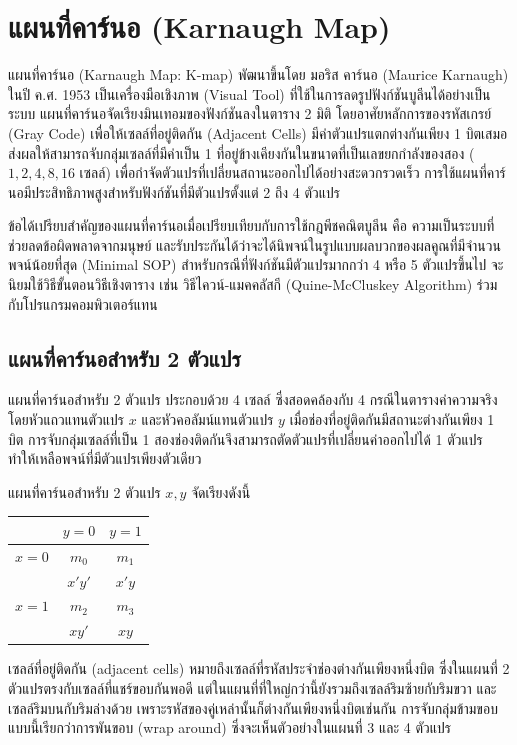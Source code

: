 \section{แผนที่คาร์นอ (Karnaugh Map)}
\label{sec:karnaugh-map}

แผนที่คาร์นอ (Karnaugh Map: K-map) พัฒนาขึ้นโดย มอริส คาร์นอ (Maurice Karnaugh) ในปี ค.ศ. 1953 เป็นเครื่องมือเชิงภาพ (Visual Tool) ที่ใช้ในการลดรูปฟังก์ชันบูลีนได้อย่างเป็นระบบ แผนที่คาร์นอจัดเรียงมินเทอมของฟังก์ชันลงในตาราง 2 มิติ โดยอาศัยหลักการของรหัสเกรย์ (Gray Code) เพื่อให้เซลล์ที่อยู่ติดกัน (Adjacent Cells) มีค่าตัวแปรแตกต่างกันเพียง 1 บิตเสมอ ส่งผลให้สามารถจับกลุ่มเซลล์ที่มีค่าเป็น 1 ที่อยู่ข้างเคียงกันในขนาดที่เป็นเลขยกกำลังของสอง ($1, 2, 4, 8, 16$ เซลล์) เพื่อกำจัดตัวแปรที่เปลี่ยนสถานะออกไปได้อย่างสะดวกรวดเร็ว การใช้แผนที่คาร์นอมีประสิทธิภาพสูงสำหรับฟังก์ชันที่มีตัวแปรตั้งแต่ 2 ถึง 4 ตัวแปร~\parencite{mano2018digital}

ข้อได้เปรียบสำคัญของแผนที่คาร์นอเมื่อเปรียบเทียบกับการใช้กฎพีชคณิตบูลีน คือ ความเป็นระบบที่ช่วยลดข้อผิดพลาดจากมนุษย์ และรับประกันได้ว่าจะได้นิพจน์ในรูปแบบผลบวกของผลคูณที่มีจำนวนพจน์น้อยที่สุด (Minimal SOP) สำหรับกรณีที่ฟังก์ชันมีตัวแปรมากกว่า 4 หรือ 5 ตัวแปรขึ้นไป จะนิยมใช้วิธีขั้นตอนวิธีเชิงตาราง เช่น วิธีไควน์-แมคคลัสกี (Quine-McCluskey Algorithm) ร่วมกับโปรแกรมคอมพิวเตอร์แทน

\subsection{แผนที่คาร์นอสำหรับ 2 ตัวแปร}
แผนที่คาร์นอสำหรับ 2 ตัวแปร ประกอบด้วย 4 เซลล์ ซึ่งสอดคล้องกับ 4 กรณีในตารางค่าความจริง โดยหัวแถวแทนตัวแปร $x$ และหัวคอลัมน์แทนตัวแปร $y$ เมื่อช่องที่อยู่ติดกันมีสถานะต่างกันเพียง 1 บิต การจับกลุ่มเซลล์ที่เป็น 1 สองช่องติดกันจึงสามารถตัดตัวแปรที่เปลี่ยนค่าออกไปได้ 1 ตัวแปร ทำให้เหลือพจน์ที่มีตัวแปรเพียงตัวเดียว~\parencite{roth2021logic}

\begin{principle}
แผนที่คาร์นอสำหรับ 2 ตัวแปร $x, y$ จัดเรียงดังนี้

\begin{center}
\begin{tabular}{|c|c|c|}
\hline
 & $y = 0$ & $y = 1$ \\
\hline
$x = 0$ & $m_0$ & $m_1$ \\
       & $x'y'$ & $x'y$ \\
\hline
$x = 1$ & $m_2$ & $m_3$ \\
       & $xy'$ & $xy$ \\
\hline
\end{tabular}
\end{center}

เซลล์ที่อยู่ติดกัน (adjacent cells) หมายถึงเซลล์ที่รหัสประจำช่องต่างกันเพียงหนึ่งบิต ซึ่งในแผนที่ 2 ตัวแปรตรงกับเซลล์ที่แชร์ขอบกันพอดี แต่ในแผนที่ที่ใหญ่กว่านี้ยังรวมถึงเซลล์ริมซ้ายกับริมขวา และเซลล์ริมบนกับริมล่างด้วย เพราะรหัสของคู่เหล่านั้นก็ต่างกันเพียงหนึ่งบิตเช่นกัน การจับกลุ่มข้ามขอบแบบนี้เรียกว่าการพันขอบ (wrap around) ซึ่งจะเห็นตัวอย่างในแผนที่ 3 และ 4 ตัวแปร
\end{principle}

